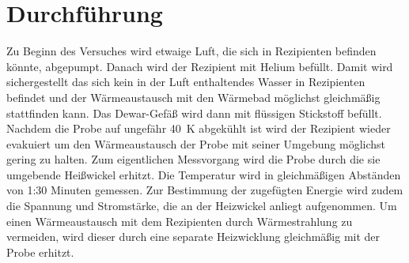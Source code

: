 \section{Durchführung}

Zu Beginn des Versuches wird etwaige Luft, die sich in Rezipienten befinden könnte, abgepumpt. Danach wird der Rezipient mit Helium befüllt. Damit wird sichergestellt das sich kein in der Luft enthaltendes Wasser in Rezipienten befindet und der Wärmeaustausch mit den Wärmebad möglichst gleichmäßig stattfinden kann. Das Dewar-Gefäß wird dann mit flüssigen Stickstoff befüllt. Nachdem die Probe auf ungefähr \SI{40}{\K} abgekühlt ist wird der Rezipient wieder evakuiert um den Wärmeaustausch der Probe mit seiner Umgebung möglichst gering zu halten.
Zum eigentlichen Messvorgang wird die Probe durch die sie umgebende Heißwickel erhitzt. Die Temperatur wird in gleichmäßigen Abständen von 1:30 Minuten gemessen. Zur Bestimmung der zugefügten Energie wird zudem die Spannung und Stromstärke, die an der Heizwickel anliegt aufgenommen. Um einen Wärmeaustausch mit dem Rezipienten durch Wärmestrahlung zu vermeiden, wird dieser durch eine separate Heizwicklung gleichmäßig mit der Probe erhitzt. 

